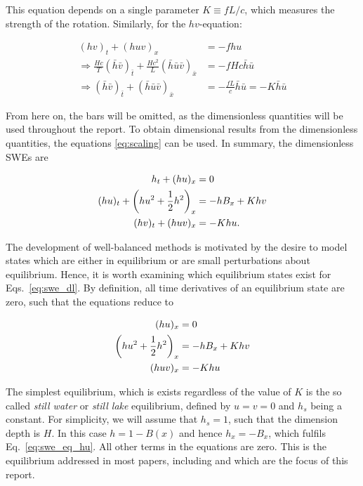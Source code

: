 This equation depends on a single parameter $K \equiv fL/c$, which measures the strength of the rotation. Similarly, for the $hv$-equation:

\begin{align}
  (hv)_t + (huv)_x & = - fhu \\
  \Rightarrow \frac{Hc}{T} (\bar h\bar v)_{\bar t} + \frac{Hc^2}{L} (\bar h\bar u\bar v)_{\bar x} & = - fHc\bar h\bar u \\
  \Rightarrow (\bar h\bar v)_{\bar t} + (\bar h\bar u\bar v)_{\bar x} & = - \frac{fL}{c}\bar h\bar u = -K\bar h\bar u
\end{align}

From here on, the bars will be omitted, as the dimensionless quantities will be used throughout the report. To obtain dimensional results from the dimensionless quantities, the equations \ref{eq:scaling} can be used. In summary, the dimensionless SWEs are

\begin{subequations}
  \label{eq:swe_dl}
  \begin{align}
    h_{t} + (h u)_{x} & = 0 \label{eq:swe_dl_h} \\
    (hu)_{t} + \qty(hu^2 + \frac{1}{2} h^2)_{x} & = - hB_{x} + Khv \label{eq:swe_dl_hu} \\
    (hv)_{t} + (huv)_{x} & = -Khu.\label{eq:swe_dl_hv}
  \end{align}
\end{subequations}

The development of well-balanced methods is motivated by the desire to model states which are either in equilibrium or are small perturbations about equilibrium. Hence, it is worth examining which equilibrium states exist for Eqs.~\ref{eq:swe_dl}. By definition, all time derivatives of an equilibrium state are zero, such that the equations reduce to

\begin{subequations}
  \label{eq:swe_eq}
  \begin{align}
    (h u)_{x} & = 0 \label{eq:swe_eq_h} \\
    \qty(hu^2 + \frac{1}{2} h^2)_{x} & = - hB_{x} + Khv \label{eq:swe_eq_hu}\\
    (huv)_{x} & = -Khu \label{eq:swe_eq_hv}
  \end{align}
\end{subequations}

The simplest equilibrium, which is exists regardless of the value of $K$ is the so called \emph{still water} or \emph{still lake} equilibrium, defined by $u = v = 0$ and $h_s$ being a constant. For simplicity, we will assume that $h_s = 1$, such that the dimension depth is $H$. In this case $h = 1 - B(x)$ and hence $h_x = - B_x$, which fulfils Eq.~\ref{eq:swe_eq_hu}. All other terms in the equations are zero. This is the equilibrium addressed in most papers, including \citet{leveque1998balancing} and \citet{rogers2003mathematical} which are the focus of this report.

